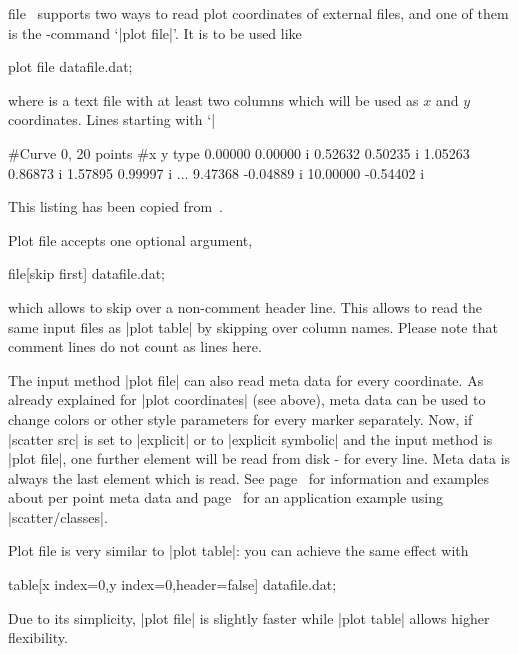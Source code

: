 \begin{addplotoperation}[]{file}{}
\PGFPlots\ supports two ways to read plot coordinates of external files, and one of them is the \Tikz-command `|plot file|'. It is to be used like
\begin{codeexample}
\addplot plot file {datafile.dat};
\end{codeexample}
where  is a text file with at least two columns which will be used as $x$ and $y$ coordinates. Lines starting with `|%
\begin{codeexample}
#Curve 0, 20 points
#x y type
0.00000 0.00000 i
0.52632 0.50235 i
1.05263 0.86873 i
1.57895 0.99997 i
...
9.47368 -0.04889 i
10.00000 -0.54402 i
\end{codeexample}
This listing has been copied from~\cite[section~16.4]{tikz}.

Plot file accepts one optional argument,

\begin{codeexample}
\addplot file[skip first] {datafile.dat};
\end{codeexample}

\noindent
which allows to skip over a non-comment header line. This allows to read the same input files as |plot table| by skipping over column names. Please note that comment lines do not count as lines here.

The input method |plot file| can also read meta data for every coordinate. As already explained for |plot coordinates| (see above), meta data can be used to change colors or other style parameters for every marker separately. Now, if |scatter src| is set to |explicit| or to |explicit symbolic| and the input method is |plot file|, one further element will be read from disk - for every line. Meta data is always the last element which is read. See page~\pageref{pgfplots:scatter:src} for information and examples about per point meta data and page~\pageref{pgfplots:scatterclasses} for an application example using |scatter/classes|.


Plot file is very similar to |plot table|: you can achieve the same effect with
\begin{codeexample}
\addplot table[x index=0,y index=0,header=false] {datafile.dat};
\end{codeexample}
\noindent Due to its simplicity, |plot file| is slightly faster while |plot table| allows higher flexibility.
\end{addplotoperation}

